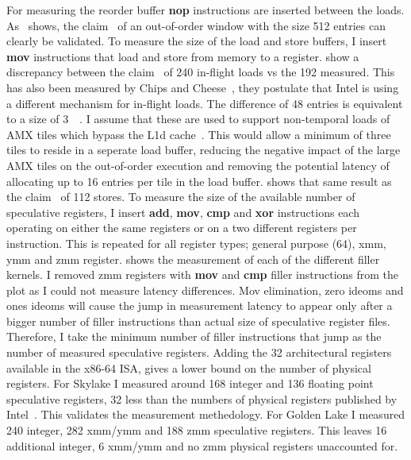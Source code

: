 For measuring the reorder buffer \textbf{nop} instructions are inserted between the loads.
As~ shows, the claim~\cite{ServerTheHome_2023_SPR_Press,Wccftech_2023_SPR_Press} of an out-of-order window with the size \SI{512}{} entries can clearly be validated.
To measure the size of the load and store buffers, I insert \textbf{mov} instructions that load and store from memory to a register.
 show a discrepancy between the claim~\cite{ServerTheHome_2023_SPR_Press,Wccftech_2023_SPR_Press} of 240 in-flight loads vs the 192 measured.
This has also been measured by Chips and Cheese~\cite{Chipsandcheese_2023_GoldenCove_Vector_Register}, they postulate that Intel is using a different mechanism for in-flight loads.
The difference of 48 entries is equivalent to a size of \SI{3}{\kibi\byte}.
I assume that these are used to support non-temporal loads of AMX tiles which bypass the L1d cache~\cite[Sec. 20.8]{Intel_Optimization_Reference_Manual_050}.
This would allow a minimum of three tiles to reside in a seperate load buffer, reducing the negative impact of the large AMX tiles on the out-of-order execution and removing the potential latency of allocating up to 16 entries per tile in the load buffer.
 shows that same result as the claim~\cite{ServerTheHome_2023_SPR_Press,Wccftech_2023_SPR_Press} of 112 stores.
To measure the size of the available number of speculative registers, I insert \textbf{add}, \textbf{mov}, \textbf{cmp} and \textbf{xor} instructions each operating on either the same registers or on a two different registers per instruction.
This is repeated for all register types; general purpose (\SI{64}{\bit}), xmm, ymm and zmm register.
 shows the measurement of each of the different filler kernels.
I removed zmm registers with \textbf{mov} and \textbf{cmp} filler instructions from the plot as I could not measure latency differences.
Mov elimination, zero ideoms and ones ideoms will cause the jump in measurement latency to appear only after a bigger number of filler instructions than actual size of speculative register files.
Therefore, I take the minimum number of filler instructions that jump as the number of measured speculative registers.
Adding the 32 architectural registers available in the x86-64 ISA, gives a lower bound on the number of physical registers.
For Skylake I measured around 168 integer and 136 floating point speculative registers, 32 less than the numbers of physical registers published by Intel~\cite{Intel_2017_Skylake_SP}.
This validates the measurement methedology.
For Golden Lake I measured 240 integer, 282 xmm/ymm and 188 zmm speculative registers.
This leaves 16 additional integer, 6 xmm/ymm and no zmm physical registers unaccounted for.


